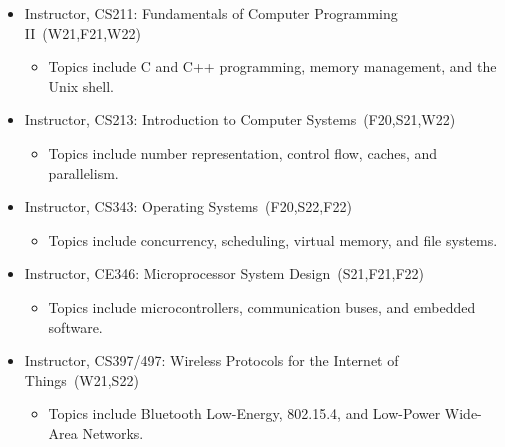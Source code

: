 \documentclass{article}
\begin{document}
\begin{itemize}
  \item[] Instructor, CS211: Fundamentals of Computer Programming II~(W21,F21,W22)
    \vspace{-\topsep}
    \vspace{\itemsep}
    \begin{itemize}
      \item Topics include C and C++ programming, memory management, and the Unix shell.
    \end{itemize}
  \item[] Instructor, CS213: Introduction to Computer Systems~(F20,S21,W22)
    \vspace{-\topsep}
    \vspace{\itemsep}
    \begin{itemize}
      \item Topics include number representation, control flow, caches, and parallelism.
    \end{itemize}
  \item[] Instructor, CS343: Operating Systems~(F20,S22,F22)
    \vspace{-\topsep}
    \vspace{\itemsep}
    \begin{itemize}
      \item Topics include concurrency, scheduling, virtual memory, and file systems.
    \end{itemize}
  \item[] Instructor, CE346: Microprocessor System Design~(S21,F21,F22)
    \vspace{-\topsep}
    \vspace{\itemsep}
    \begin{itemize}
      \item Topics include microcontrollers, communication buses, and embedded software.
    \end{itemize}
  \item[] Instructor, CS397/497: Wireless Protocols for the Internet of Things~(W21,S22)
    \vspace{-\topsep}
    \vspace{\itemsep}
    \begin{itemize}
      \item Topics include Bluetooth Low-Energy, 802.15.4, and Low-Power Wide-Area Networks.
    \end{itemize}
\end{itemize}

\newpage
\end{document}
